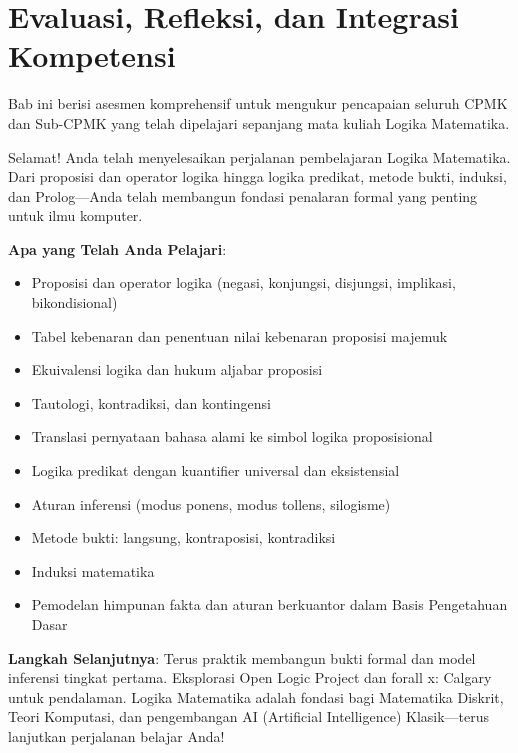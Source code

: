 \documentclass[../main]{subfiles}
\begin{document}
\chapter{Evaluasi, Refleksi, dan Integrasi Kompetensi}

Bab ini berisi asesmen komprehensif untuk mengukur pencapaian seluruh CPMK dan Sub-CPMK yang telah dipelajari sepanjang mata kuliah Logika Matematika.






\begin{rangkuman}
Selamat! Anda telah menyelesaikan perjalanan pembelajaran Logika Matematika. Dari proposisi dan operator logika hingga logika predikat, metode bukti, induksi, dan Prolog---Anda telah membangun fondasi penalaran formal yang penting untuk ilmu komputer.

\textbf{Apa yang Telah Anda Pelajari}:
\begin{itemize}
  \item Proposisi dan operator logika (negasi, konjungsi, disjungsi, implikasi, bikondisional)
  \item Tabel kebenaran dan penentuan nilai kebenaran proposisi majemuk
  \item Ekuivalensi logika dan hukum aljabar proposisi
  \item Tautologi, kontradiksi, dan kontingensi
  \item Translasi pernyataan bahasa alami ke simbol logika proposisional
  \item Logika predikat dengan kuantifier universal dan eksistensial
  \item Aturan inferensi (modus ponens, modus tollens, silogisme)
  \item Metode bukti: langsung, kontraposisi, kontradiksi
  \item Induksi matematika
  \item Pemodelan himpunan fakta dan aturan berkuantor dalam Basis Pengetahuan Dasar
\end{itemize}

\textbf{Langkah Selanjutnya}:
Terus praktik membangun bukti formal dan model inferensi tingkat pertama. Eksplorasi Open Logic Project dan forall x: Calgary untuk pendalaman. Logika Matematika adalah fondasi bagi Matematika Diskrit, Teori Komputasi, dan pengembangan AI (Artificial Intelligence) Klasik---terus lanjutkan perjalanan belajar Anda!
\end{rangkuman}

\ifSubfilesClassLoaded{
  \renewcommand{\bibname}{Daftar Pustaka}
  
  
}{}
\end{document}
